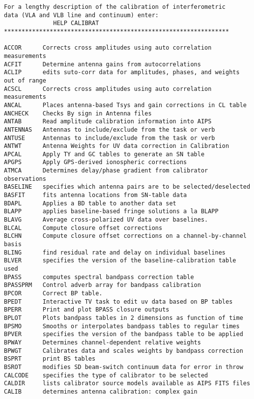 \vskip 0.5pt
\bbve\begin{verbatim}
For a lengthy description of the calibration of interferometric
data (VLA and VLB line and continuum) enter:
              HELP CALIBRAT
****************************************************************

ACCOR      Corrects cross amplitudes using auto correlation measurements
ACFIT      Determine antenna gains from autocorrelations
ACLIP      edits suto-corr data for amplitudes, phases, and weights out of range
ACSCL      Corrects cross amplitudes using auto correlation measurements
ANCAL      Places antenna-based Tsys and gain corrections in CL table
ANCHECK    Checks By sign in Antenna files
ANTAB      Read amplitude calibration information into AIPS
ANTENNAS   Antennas to include/exclude from the task or verb
ANTUSE     Antennas to include/exclude from the task or verb
ANTWT      Antenna Weights for UV data correction in Calibration
APCAL      Apply TY and GC tables to generate an SN table
APGPS      Apply GPS-derived ionospheric corrections
ATMCA      Determines delay/phase gradient from calibrator observations
BASELINE   specifies which antenna pairs are to be selected/deselected
BASFIT     fits antenna locations from SN-table data
BDAPL      Applies a BD table to another data set
BLAPP      applies baseline-based fringe solutions a la BLAPP
BLAVG      Average cross-polarized UV data over baselines.
BLCAL      Compute closure offset corrections
BLCHN      Compute closure offset corrections on a channel-by-channel basis
BLING      find residual rate and delay on individual baselines
BLVER      specifies the version of the baseline-calibration table used
BPASS      computes spectral bandpass correction table
BPASSPRM   Control adverb array for bandpass calibration
BPCOR      Correct BP table.
BPEDT      Interactive TV task to edit uv data based on BP tables
BPERR      Print and plot BPASS closure outputs
BPLOT      Plots bandpass tables in 2 dimensions as function of time
BPSMO      Smooths or interpolates bandpass tables to regular times
BPVER      specifies the version of the bandpass table to be applied
BPWAY      Determines channel-dependent relative weights
BPWGT      Calibrates data and scales weights by bandpass correction
BSPRT      print BS tables
BSROT      modifies SD beam-switch continuum data for error in throw
CALCODE    specifies the type of calibrator to be selected
CALDIR     lists calibrator source models available as AIPS FITS files
CALIB      determines antenna calibration: complex gain

\end{verbatim}
